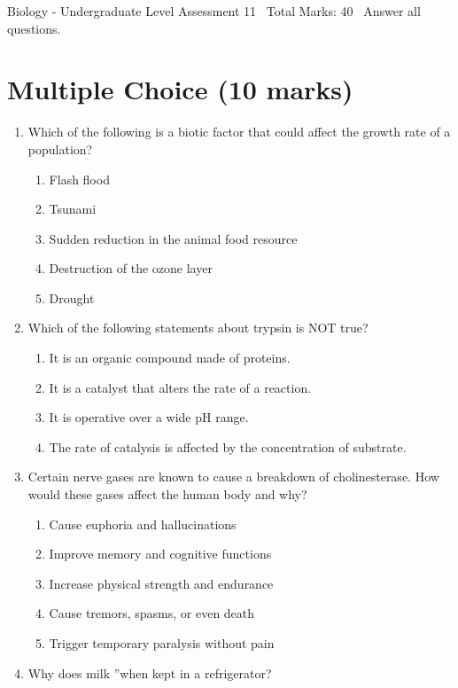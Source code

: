 \documentclass[12pt]{article}
\begin{document}
\begin{center}
Biology - Undergraduate Level Assessment 11 \
Total Marks: 40 \
Answer all questions.
\end{center}

\section*{Multiple Choice (10 marks)}
\begin{enumerate}[label=\arabic*.]
\item Which of the following is a biotic factor that could affect the growth rate of a population?
\begin{enumerate}[label=(\alph*)]
    \item Flash flood
    \item Tsunami
    \item Sudden reduction in the animal food resource
    \item Destruction of the ozone layer
    \item Drought
\end{enumerate}
\item Which of the following statements about trypsin is NOT true?
\begin{enumerate}[label=(\alph*)]
    \item It is an organic compound made of proteins.
    \item It is a catalyst that alters the rate of a reaction.
    \item It is operative over a wide pH range.
    \item The rate of catalysis is affected by the concentration of substrate.
\end{enumerate}
\item Certain nerve gases are known to cause a breakdown of cholinesterase. How would these gases affect the human body and why?
\begin{enumerate}[label=(\alph*)]
    \item Cause euphoria and hallucinations
    \item Improve memory and cognitive functions
    \item Increase physical strength and endurance
    \item Cause tremors, spasms, or even death
    \item Trigger temporary paralysis without pain
\end{enumerate}
\item Why does milk \textquotedblleftspoil\textquotedblright when kept in a refrigerator?

\end{enumerate}
\end{document}
